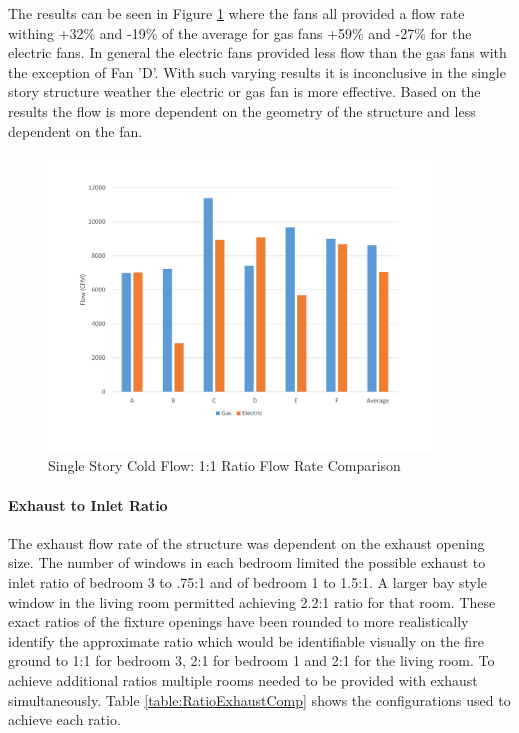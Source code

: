 \documentclass{article}
\begin{document}
The results can be seen in Figure \ref{fig:1_1RatioSingleStory} where the fans all provided a flow rate withing +32\% and -19\% of the average for gas fans +59\% and -27\% for the electric fans. In general the electric fans provided less flow than the gas fans with the exception of Fan 'D'. With such varying results it is inconclusive in the single story structure weather the electric or gas fan is more effective. Based on the results the flow is more dependent on the geometry of the structure and less dependent on the fan. 

\begin{figure}[H]
	\centering
	\includegraphics[width=4in]{0_Images/ColdFlow/Single_Story/1_1_Ratio.pdf}
	\caption{Single Story Cold Flow: 1:1 Ratio Flow Rate Comparison}
	\label{fig:1_1RatioSingleStory}
\end{figure}

\paragraph{Exhaust to Inlet Ratio} \mbox{}

The exhaust flow rate of the structure was dependent on the exhaust opening size. The number of windows in each bedroom limited the possible exhaust to inlet ratio of bedroom 3 to .75:1 and of bedroom 1 to 1.5:1.  A larger bay style window in the living room permitted achieving 2.2:1 ratio for that room. These exact ratios of the fixture openings have been rounded to more realistically identify the approximate ratio which would be identifiable visually on the fire ground to 1:1 for bedroom 3, 2:1 for bedroom 1 and 2:1 for the living room. To achieve additional ratios multiple rooms needed to be provided with exhaust simultaneously. Table \ref{table:RatioExhaustComp} shows the configurations used to achieve each ratio.
\end{document}
